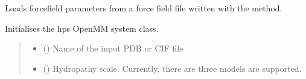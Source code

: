 \documentclass[letterpaper,10pt,english]{sphinxmanual}
\begin{document}
\begin{fulllineitems}
\begin{fulllineitems}
\begin{quote}
\begin{description}
\end{description}\end{quote}

\end{fulllineitems}


\begin{fulllineitems}
\label{\detokenize{modules/system:hps.core.system.loadForcefieldFromFile}}
\pysigstartsignatures
{}
\pysigstopsignatures
\sphinxAtStartPar
Loads forcefield parameters from a force field file written with
the  method.

\end{fulllineitems}


\begin{fulllineitems}
\label{\detokenize{modules/system:hps.core.system.__init__}}
\pysigstartsignatures
{}
\pysigstopsignatures
\sphinxAtStartPar
Initialises the hps OpenMM system class.
\begin{quote}\begin{description}
\begin{itemize}
\item {} 
\sphinxAtStartPar
{} (\sphinxstyleliteralemphasis{\sphinxupquote{ {[}}}\sphinxstyleliteralemphasis{\sphinxupquote{{]}}}) \textendash{} Name of the input PDB or CIF file

\item {} 
\sphinxAtStartPar
{} (\sphinxstyleliteralemphasis{\sphinxupquote{,}}\sphinxstyleliteralemphasis{\sphinxupquote{ {[}}}\sphinxstyleliteralemphasis{\sphinxupquote{, }}\sphinxstyleliteralemphasis{\sphinxupquote{{]}}}) \textendash{} Hydropathy scale. Currently, there are three models are supported.


\end{itemize}
\end{description}
\end{quote}
\end{fulllineitems}
\end{fulllineitems}
\end{document}

